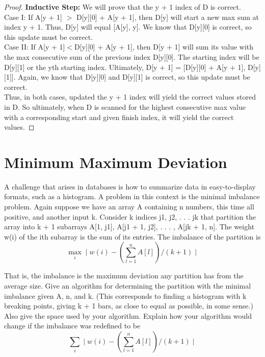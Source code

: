 \documentclass[11pt, solution, letterpaper]{format}
\begin{document}
\begin{proof}
\textbf{Inductive Step:} We will prove that the y + 1 index of D is correct.\\

Case I: If A[y + 1] $>$ D[y][0] + A[y + 1], then D[y] will start a new max sum at index y + 1. Thus, D[y] will equal [A[y], y]. We know that D[y][0] is correct, so this update must be correct.\\

Case II: If A[y + 1]$ < $D[y][0] + A[y + 1], then D[y + 1] will sum its value with the max consecutive sum of the previous index  D[y][0]. The starting index will be D[y][1] or the yth starting index. Ultimately, D[y + 1] = [D[y][0] + A[y + 1], D[y][1]]. Again, we know that D[y][0] and D[y][1] is correct, so this update must be correct.\\

Thus, in both cases, updated the y + 1 index will yield the correct values stored in D. So ultimately, when D is scanned for the highest consecutive max value with a corresponding start and given finish index, it will yield the correct values. 
\end{proof}



\clearpage
\section{Minimum Maximum Deviation}
 A challenge that arises in databases is how to summarize data in easy-to-display formats, such as a histogram. A
problem in this context is the minimal imbalance problem. Again suppose we have an array A containing n numbers,
this time all positive, and another input k. Consider k indices j1, j2, . . . jk that partition the array into k + 1 subarrays
A[1, j1], A[j1 + 1, j2], . . . , A[jk + 1, n]. The weight w(i) of the ith subarray is the sum of its entries. The imbalance
of the partition is
\begin{equation} 
\max\limits_{i} \mid w(i) - (\sum_{l=1}^{n} A[l]) / (k + 1) \mid
\end{equation} 

That is, the imbalance is the maximum deviation any partition has from the average size.
Give an algorithm for determining the partition with the minimal imbalance given A, n, and k. (This corresponds to
finding a histogram with k breaking points, giving k + 1 bars, as close to equal as possible, in some sense.) Also give
the space used by your algorithm.
Explain how your algorithm would change if the imbalance was redefined to be
\begin{equation} 
\sum\limits_{i} \mid w(i) - (\sum_{l=1}^{n} A[l]) / (k + 1) \mid
\end{equation} 
\end{document}
